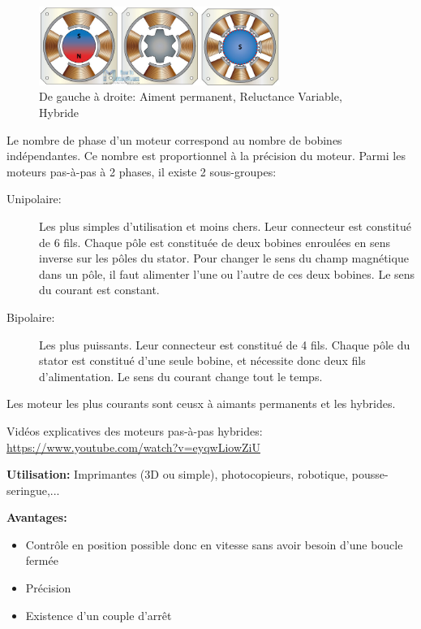 \documentclass[a4paper, 11pt]{report}
\begin{document}
\begin{figure}[h]
\begin{centering}
\includegraphics[width=0.7\textwidth]{images/DifferentsMPP.jpg}
\caption{De gauche à droite: Aiment permanent, Reluctance Variable, Hybride}
\par\end{centering}
\end{figure}

Le nombre de phase d'un moteur correspond au nombre de bobines indépendantes. Ce nombre est proportionnel à la précision du moteur.
Parmi les moteurs pas-à-pas à 2 phases, il existe 2 sous-groupes:
\begin{description}
\item[Unipolaire:]Les plus simples d'utilisation et moins chers. Leur connecteur est constitué de 6 fils. Chaque pôle est constituée de deux bobines enroulées en sens inverse sur les pôles du stator. Pour changer le sens du champ magnétique dans un pôle, il faut alimenter l'une ou l'autre de ces deux bobines. Le sens du courant est constant.
\item[Bipolaire:]Les plus puissants. Leur connecteur est constitué de 4 fils. Chaque pôle du stator est constitué d'une seule bobine, et nécessite donc deux fils d'alimentation. Le sens du courant change tout le temps.
\end{description}

Les moteur les plus courants sont ceusx à aimants permanents et les hybrides.

Vidéos explicatives des moteurs pas-à-pas hybrides: \url{https://www.youtube.com/watch?v=eyqwLiowZiU}

\textbf{Utilisation:} Imprimantes (3D ou simple), photocopieurs, robotique, pousse-seringue,...

\textbf{Avantages:}
\begin{itemize}
\item Contrôle en position possible donc en vitesse sans avoir besoin d'une boucle fermée
\item Précision
\item Existence d'un couple d'arrêt
\end{itemize}
\end{document}
